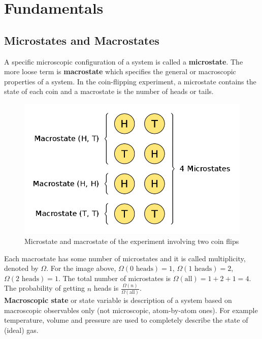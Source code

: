 \section{Fundamentals}

\subsection{Microstates and Macrostates}

A specific microscopic configuration of a system is called a \textbf{microstate}. The more loose term is \textbf{macrostate} which specifies the general or macroscopic properties of a system. In the coin-flipping experiment, a microstate contains the state of each coin and a macrostate is the number of heads or tails.

\begin{figure}[H]
	\centering
	\includegraphics[width=120mm]{5.png}
	\caption{Microstate and macrostate of the experiment involving two coin flips}
\end{figure}

Each macrostate has some number of microstates and it is called multiplicity, denoted by $\Omega$. For the image above, $\Omega(\text{0 heads})=1$, $\Omega(\text{1 heads})=2$, $\Omega(\text{2 heads})=1$. The total number of microstates is $\Omega(\text{all})=1+2+1=4$. The probability of getting $n$ heads is $\frac{\Omega(n)}{\Omega(\text{all})}$. \\

\textbf{Macroscopic state} or state variable is description of a system based on macroscopic observables only (not microscopic, atom-by-atom ones). For example temperature, volume and pressure are used to completely describe the state of (ideal) gas.

